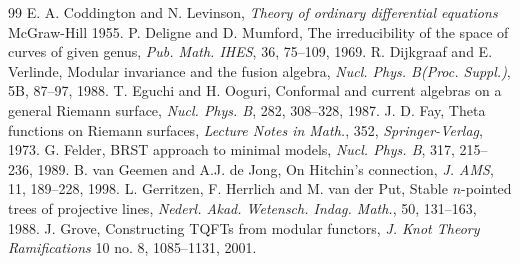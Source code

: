 \begin{thebibliography}{99}
 E. A. Coddington and N. Levinson, \emph{Theory of ordinary differential equations} McGraw-Hill 1955.
 P. Deligne and D. Mumford, The irreducibility of the space of curves of given genus, \emph{Pub. Math. IHES}, 36, 75--109, 1969.
 R. Dijkgraaf and E. Verlinde, Modular invariance and the fusion algebra, \emph{Nucl. Phys. B(Proc. Suppl.)}, 5B, 87--97, 1988.
 T. Eguchi and H. Ooguri, Conformal and current algebras on a general Riemann surface, \emph{Nucl. Phys. B}, 282, 308--328, 1987.
 J. D. Fay, Theta functions on Riemann surfaces, \emph{Lecture Notes in Math.}, 352, \emph{Springer-Verlag}, 1973.
 G. Felder, BRST approach to minimal models, \emph{Nucl. Phys. B}, 317, 215--236, 1989.
 B. van Geemen and A.J. de Jong, On Hitchin's connection, \emph{J. AMS}, 11, 189--228, 1998.
 L. Gerritzen, F. Herrlich and M. van der Put, Stable $n$-pointed trees of projective lines, \emph{Nederl. Akad. Wetensch. Indag. Math.}, 50, 131--163, 1988.
 J. Grove, Constructing TQFTs from modular functors, \emph{J. Knot Theory Ramifications} 10 no. 8, 1085--1131, 2001.


\end{thebibliography}
